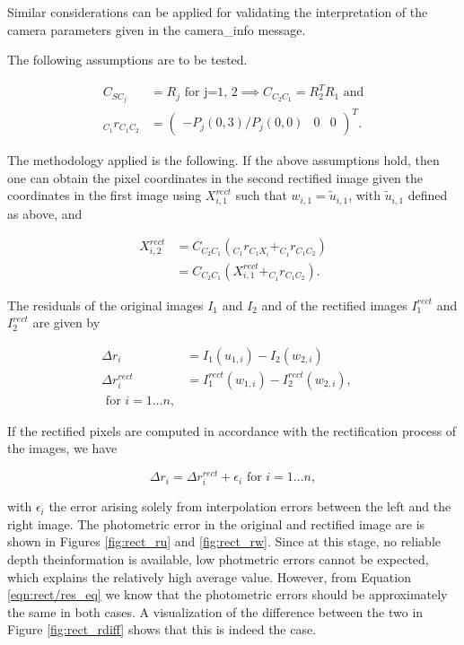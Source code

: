 Similar considerations can be applied for validating the interpretation of the
camera parameters given in the camera\_info message.

The following assumptions are to be tested.

\begin{align}
  C_{SC_j} &= R_j \text{   for j=1, 2} 
  \implies C_{C_2C_1} = R_2^TR_1 \text{   and} \\
  _{C_1}r_{C_1C_2} &= \begin{pmatrix} -P_j(0,3)/P_j(0,0) & 0 & 0
  \end{pmatrix}^T.
\end{align}

The methodology applied is the following. If the above assumptions hold, then one 
can obtain the pixel coordinates in the second rectified image given the
coordinates in the first image using $X_{i,1}^{rect}$ such that $w_{i,1} = \tilde{u}_{i,1}$, with
$\tilde{u}_{i,1}$ defined as above, and 

\begin{align}
  X_{i,2}^{rect} &= C_{C_2C_1} (_{C_1}r_{C_1X_i} + _{C_1}r_{C_1C_2}) \\
                 &= C_{C_2C_1} (X_{i,1}^{rect} + _{C_1}r_{C_1C_2}) .
\end{align}

The residuals of the original images $I_1$ and $I_2$ and of
the rectified images $I_1^{rect}$ and $I_2^{rect}$ are given by

\begin{align}
  \Delta r_i &= I_1(u_{1,i}) - I_2(w_{2,i}) \\
  \Delta r_i^{rect} &= I_1^{rect}(w_{1,i}) - I_2^{rect}(w_{2,i}), \hspace{1em} \\
  \text{   for } i = 1 \ldots n, 
  \label{eqn:rect/res_def}
\end{align}

If the rectified pixels are computed in accordance with the rectification
process of the images, we have 

\begin{equation}
  \Delta r_i = \Delta r_i^{rect} + \epsilon_i  
  \text{   for } i = 1 \ldots n, 
  \label{eqn:rect/res_eq}
\end{equation}

with $\epsilon_i$ the error arising solely from interpolation errors between the
left and the right image.
The photometric error in the original and rectified image are is shown in Figures
\ref{fig:rect_ru} and \ref{fig:rect_rw}. Since at this stage, no reliable depth
theinformation is available, low photmetric errors cannot be expected, which explains 
the relatively high average value. However, from Equation \ref{eqn:rect/res_eq}
we know that the photometric errors should be approximately the same in both
cases. A visualization of the difference between the two in Figure \ref{fig:rect_rdiff} 
shows that this is indeed the case. 

